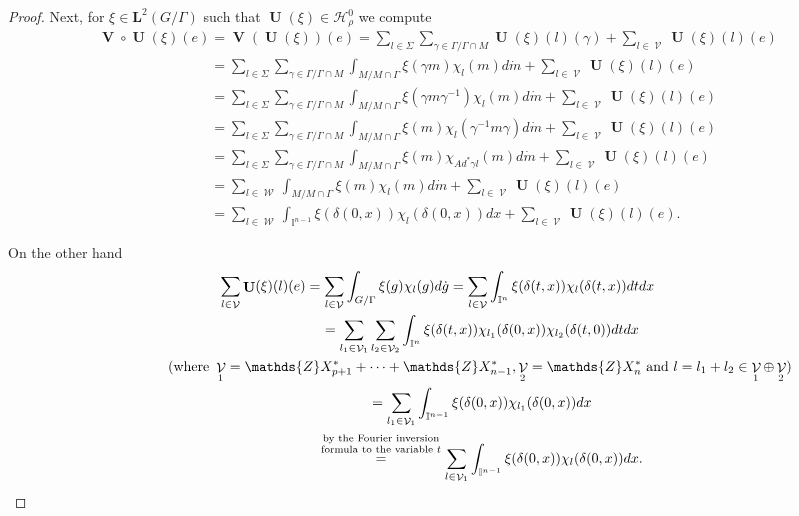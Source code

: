 \documentclass[pdftex]{sigma}
\DeclareMathOperator{\U}{\mathbf{U}}
\DeclareMathOperator{\V}{\mathbf{V}} \DeclareMathOperator{\Aut}{Aut}
\DeclareMathOperator{\nongen}{\mathcal{V}}
\DeclareMathOperator{\gen}{\mathcal{W}}
\def\tore{{\mathbb I}}
\begin{document}
\begin{proof}
Next, for $\xi\in \mathbf{L}^2(G/\Gamma)$ such that $\U(\xi)\in
\mathscr{H}_\rho^0$ we compute
\begin{gather*}
\V\circ \U(\xi)(e)  = \V(\U(\xi))(e)
 =  \sum_{l\in \Sigma} \sum_{\gamma\in \Gamma/\Gamma\cap M}
\U(\xi)(l)(\gamma)+ \sum
_{l\in \nongen}\U(\xi)(l)(e)\\
 \phantom{\V\circ \U(\xi)(e)}{}
 =  \sum_{l\in \Sigma} \sum_{\gamma\in \Gamma/\Gamma\cap M}
\int_{M/M\cap \Gamma}\xi(\gamma m) \chi_l(m) d\dot{m} + \sum
_{l\in \nongen}\U(\xi)(l)(e)\\
\phantom{\V\circ \U(\xi)(e)}{}
=  \sum_{l\in \Sigma} \sum_{\gamma\in \Gamma/\Gamma\cap M}
\int_{M/M\cap \Gamma} \xi(\gamma m \gamma^{-1} ) \chi_l(m) d\dot{m}
+ \sum
_{l\in \nongen}\U(\xi)(l)(e)\\
\phantom{\V\circ \U(\xi)(e)}{}
=  \sum_{l\in \Sigma} \sum_{\gamma\in \Gamma/\Gamma\cap M}
\int_{M/M\cap \Gamma} \xi( m  ) \chi_l( \gamma^{-1} m \gamma)
d\dot{m} + \sum
_{l\in \nongen}\U(\xi)(l)(e)\\
\phantom{\V\circ \U(\xi)(e)}{}
=  \sum_{l\in \Sigma} \sum_{\gamma\in \Gamma/\Gamma\cap M}
\int_{M/M\cap \Gamma} \xi( m  ) \chi_{Ad^* \gamma l}(  m ) d\dot{m}
+ \sum
_{l\in \nongen}\U(\xi)(l)(e)\\
\phantom{\V\circ \U(\xi)(e)}{}
=  \sum_{l\in \gen}  \int_{M/M\cap \Gamma} \xi( m  ) \chi_l( m )
d\dot{m} + \sum
_{l\in \nongen}\U(\xi)(l)(e)\\
\phantom{\V\circ \U(\xi)(e)}{}
=  \sum_{l\in \gen} \int_{\tore^{n-1}} \xi(\delta(0, x))
\chi_l(\delta(0, x))dx  + \sum _{l\in \nongen}\U(\xi)(l)(e).
\end{gather*}

On the other hand
\begin{gather*}
\sum _{l\in \nongen}\U(\xi)(l)(e) = \sum _{l\in \nongen}
\int_{G/\Gamma} \xi(g) \chi_l(g) d\dot{g}
 = \sum_{l\in \nongen}\int_{\tore^{n}}
    \xi(\delta(t, x))
 \chi_l(\delta(t, x)) dt dx \\
\hphantom{\sum _{l\in \nongen}\U(\xi)(l)(e)}{}
 = \sum_{l_1\in \nongen_1} \sum_{l_2\in \nongen_2} \int_{\tore^{n}}
    \xi(\delta(t, x))
 \chi_{l_1}(\delta(0, x)) \chi_{l_2}(\delta(t, 0) ) dt dx \\
\hphantom{\sum _{l\in \nongen}\U(\xi)(l)(e)}{}
(\text{where } \nongen_1 = \mathds{Z} X_{p+1}^*+\cdots+\mathds{Z}X_{n-1}^*,
     \nongen_2 =\mathds{Z}X_{n}^* \text{ and } l = l_1+l_2
      \in \nongen_1\oplus \nongen_2) \\
\hphantom{\sum _{l\in \nongen}\U(\xi)(l)(e)}{}
= \sum_{l_1\in \nongen_1} \int_{\tore^{n-1}}
    \xi(\delta(0, x))
\chi_{l_1}(\delta(0, x))   dx \\
\hphantom{\sum _{l\in \nongen}\U(\xi)(l)(e)}{}
\overset{\mbox{\scriptsize $\begin{array}{@{}c@{}}\text{by the Fourier inversion} \\ \text{formula to the variable  $t$}\end{array}$}}{=} \sum_{l\in \nongen_1} \int_{\tore^{n-1}}
    \xi(\delta(0, x))
 \chi_{l}(\delta(0, x))  dx.
\end{gather*}


\end{proof}
\end{document}
